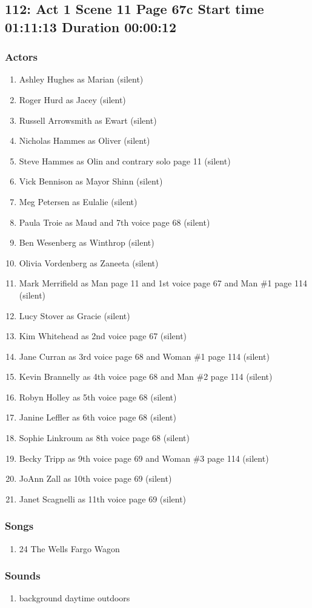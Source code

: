 \subsection{112: Act 1 Scene 11 Page 67c Start time 01:11:13 Duration 00:00:12}

\subsubsection{Actors}
\begin{enumerate}
\item Ashley Hughes as Marian (silent)
\item Roger Hurd as Jacey (silent)
\item Russell Arrowsmith as Ewart (silent)
\item Nicholas Hammes as Oliver (silent)
\item Steve Hammes as Olin and contrary solo page 11 (silent)
\item Vick Bennison as Mayor Shinn (silent)
\item Meg Petersen as Eulalie (silent)
\item Paula Troie as Maud and 7th voice page 68 (silent)
\item Ben Wesenberg as Winthrop (silent)
\item Olivia Vordenberg as Zaneeta (silent)
\item Mark Merrifield as Man page 11 and 1st voice page 67 and Man \#1 page 114 (silent)
\item Lucy Stover as Gracie (silent)
\item Kim Whitehead as 2nd voice page 67 (silent)
\item Jane Curran as 3rd voice page 68 and Woman \#1 page 114 (silent)
\item Kevin Brannelly as 4th voice page 68 and Man \#2 page 114 (silent)
\item Robyn Holley as 5th voice page 68 (silent)
\item Janine Leffler as 6th voice page 68 (silent)
\item Sophie Linkroum as 8th voice page 68 (silent)
\item Becky Tripp as 9th voice page 69 and Woman \#3 page 114 (silent)
\item JoAnn Zall as 10th voice page 69 (silent)
\item Janet Scagnelli as 11th voice page 69 (silent)
\end{enumerate}

\subsubsection{Songs}
\begin{enumerate}
\item 24 The Wells Fargo Wagon
\end{enumerate}\subsubsection{Sounds}
\begin{enumerate}
\item background daytime outdoors
\end{enumerate}
